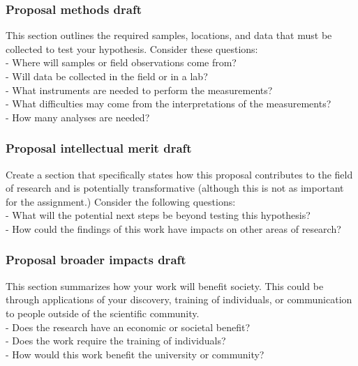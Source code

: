 \documentclass[11pt,]{article}
\begin{document}
\hypertarget{proposal-methods-draft}{%
\subsubsection{Proposal methods draft}\label{proposal-methods-draft}}

This section outlines the required samples, locations, and data that
must be collected to test your hypothesis. Consider these questions:\\
- Where will samples or field observations come from?\\
- Will data be collected in the field or in a lab?\\
- What instruments are needed to perform the measurements?\\
- What difficulties may come from the interpretations of the
measurements?\\
- How many analyses are needed?

\hypertarget{proposal-intellectual-merit-draft}{%
\subsubsection{Proposal intellectual merit
draft}\label{proposal-intellectual-merit-draft}}

Create a section that specifically states how this proposal contributes
to the field of research and is potentially transformative (although
this is not as important for the assignment.) Consider the following
questions:\\
- What will the potential next steps be beyond testing this
hypothesis?\\
- How could the findings of this work have impacts on other areas of
research?

\hypertarget{proposal-broader-impacts-draft}{%
\subsubsection{Proposal broader impacts
draft}\label{proposal-broader-impacts-draft}}

This section summarizes how your work will benefit society. This could
be through applications of your discovery, training of individuals, or
communication to people outside of the scientific community.\\
- Does the research have an economic or societal benefit?\\
- Does the work require the training of individuals?\\
- How would this work benefit the university or community?
\end{document}
